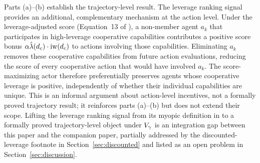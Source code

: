 \begin{remark}
\label{rem:leverage_preservation}
Parts (a)--(b) establish the trajectory-level result. The leverage ranking
    signal provides an additional, complementary mechanism at the action level.
    Under the leverage-adjusted score (Equation~13 of
    \citet{lasser2026poset}), a non-member agent $a_k$ that participates in
    high-leverage cooperative capabilities contributes a positive score bonus
    $\alpha \hat{\lambda}(d_c) \cdot \operatorname{iw}(d_c)$ to actions involving those
    capabilities. Eliminating $a_k$ removes these cooperative capabilities
    from future action evaluations, reducing the score of every cooperative
    action that would have involved $a_k$. The score-maximizing actor
    therefore preferentially preserves agents whose cooperative leverage is
    positive, independently of whether their individual capabilities are
    unique. This is an informal argument about action-level incentives, not a
    formally proved trajectory result; it reinforces parts (a)--(b) but does
    not extend their scope. Lifting the leverage ranking signal from its
    myopic definition in \citet{lasser2026poset} to a formally proved
    trajectory-level object under $V_\gamma$ is an integration gap between
    this paper and the companion paper, partially addressed by the
    discounted-leverage footnote in Section~\ref{sec:discounted} and
    listed as an open problem in Section~\ref{sec:discussion}.
\end{remark}

